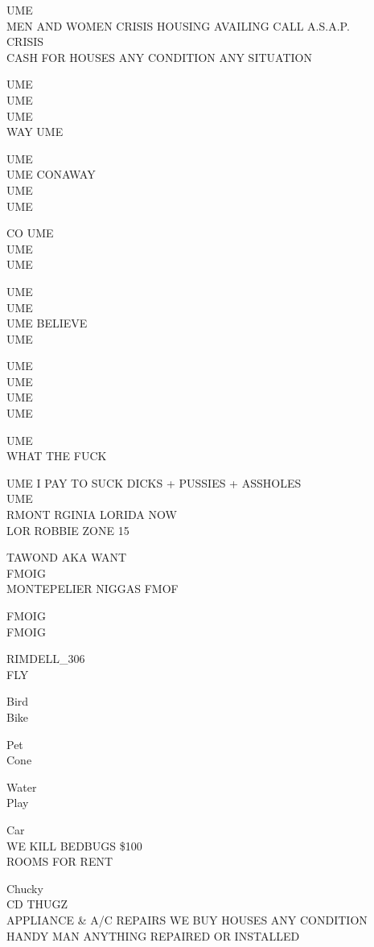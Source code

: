 \documentclass[10pt,letterpaper]{article}
\begin{document}
UME\\
MEN AND WOMEN CRISIS HOUSING AVAILING CALL A.S.A.P.\\
CRISIS\\
CASH FOR HOUSES ANY CONDITION ANY SITUATION

UME\\
UME\\
UME\\
WAY UME

UME\\
UME CONAWAY\\
UME\\
UME

CO UME\\
UME\\
UME

UME\\
UME\\
UME BELIEVE\\
UME

UME\\
UME\\
UME\\
UME

UME\\
WHAT THE FUCK

UME I PAY TO SUCK DICKS + PUSSIES + ASSHOLES\\
UME\\
RMONT RGINIA LORIDA NOW\\
LOR ROBBIE ZONE 15

TAWOND AKA WANT\\
FMOIG\\
MONTEPELIER NIGGAS FMOF

FMOIG\\
FMOIG

RIMDELL\_306\\
FLY

Bird\\
Bike

Pet\\
Cone

Water\\
Play

Car\\
WE KILL BEDBUGS \$100\\
ROOMS FOR RENT

Chucky\\
CD THUGZ\\
APPLIANCE \& A/C REPAIRS WE BUY HOUSES ANY CONDITION\\
HANDY MAN ANYTHING REPAIRED OR INSTALLED
\end{document}
